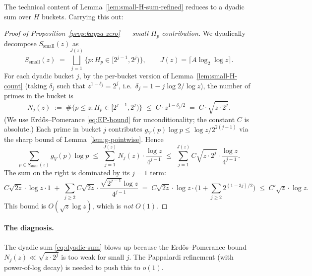 The technical content of Lemma~\ref{lem:small-H-sum-refined} reduces to
a dyadic sum over $H$ buckets. Carrying this out:

\begin{proof}[Proof of Proposition~\ref{prop:kappa-zero} ---
small-$H_{p}$ contribution]
We dyadically decompose $S_{\mathrm{small}}(z)$ as
\begin{equation}
  S_{\mathrm{small}}(z) \;=\; \bigsqcup_{j = 1}^{J(z)}
    \{ p : H_{p} \in [2^{j-1}, 2^{j}) \},
  \qquad J(z) = \lceil A \log_{2} \log z \rceil.
\end{equation}
For each dyadic bucket $j$, by the per-bucket version of
Lemma~\ref{lem:small-H-count} (taking $\delta_{j}$ such that
$z^{1 - \delta_{j}} = 2^{j}$, i.e.\ $\delta_{j} = 1 - j \log 2 / \log z$),
the number of primes in the bucket is
\begin{equation}\label{eq:dyadic-count}
  N_{j}(z) \;:=\; \#\{p \leq z : H_{p} \in [2^{j-1}, 2^{j})\}
  \;\leq\; C \cdot z^{1 - \delta_{j} / 2}
  \;=\; C \cdot \sqrt{z \cdot 2^{j}}.
\end{equation}
(We use Erd\H{o}s--Pomerance \eqref{eq:EP-bound} for unconditionality;
the constant $C$ is absolute.) Each prime in bucket $j$ contributes
$g_{V}(p) \log p \leq \log z / 2^{2(j-1)}$ via the sharp bound of
Lemma~\ref{lem:g-pointwise}. Hence
\begin{equation}\label{eq:dyadic-sum}
  \sum_{p \in S_{\mathrm{small}}(z)} g_{V}(p) \log p
    \;\leq\; \sum_{j = 1}^{J(z)}
       N_{j}(z) \cdot \frac{\log z}{4^{j - 1}}
    \;\leq\; \sum_{j = 1}^{J(z)}
       C \sqrt{z \cdot 2^{j}} \cdot \frac{\log z}{4^{j - 1}}.
\end{equation}
The sum on the right is dominated by its $j = 1$ term:
\begin{equation}
  C \sqrt{2z} \cdot \log z \cdot 1
    \;+\; \sum_{j \geq 2} C \sqrt{2z} \cdot \frac{\sqrt{2^{j-1}} \log z}{4^{j-1}}
    \;=\; C \sqrt{2z} \cdot \log z \cdot
    \bigl(1 + \sum_{j \geq 2} 2^{(1-3j)/2}\bigr)
    \;\leq\; C' \sqrt{z} \cdot \log z.
\end{equation}
This bound is $O(\sqrt{z} \log z)$, which is \emph{not} $O(1)$.
\end{proof}

\paragraph{The diagnosis.}
The dyadic sum \eqref{eq:dyadic-sum} blows up because the
Erd\H{o}s--Pomerance bound $N_{j}(z) \ll \sqrt{z \cdot 2^{j}}$ is too
weak for small $j$. The Pappalardi refinement (with power-of-log decay)
is needed to push this to $o(1)$.

